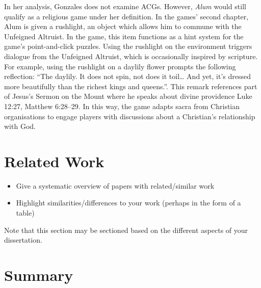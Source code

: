 In her analysis, Gonzales does not examine \acp{ACG}. However, \textit{Alum} would still qualify as a religious game under her definition. In the games' second chapter, Alum is given a rushlight, an object which allows him to commune with the Unfeigned Altruist. In the game, this item functions as a hint system for the game's point-and-click puzzles. Using the rushlight on the environment triggers dialogue from the Unfeigned Altruist, which is occasionally inspired by scripture. For example, using the rushlight on a daylily flower prompts the following reflection: ``The daylily. It does not spin, not does it toil… And yet, it’s dressed more beautifully than the richest kings and queens.''. This remark references part of Jesus's Sermon on the Mount where he speaks about divine providence Luke 12:27, Matthew 6:28–29. In this way, the game adapts sacra from Christian organisations to engage players with discussions about a Christian's relationship with God.




\section{Related Work}

  \begin{itemize}
   \item Give a systematic overview of papers with related/similar work
   \item Highlight similarities/differences to your work (perhaps in the form of a table)
  \end{itemize}

  Note that this section may be sectioned based on the different aspects of your dissertation.
\fi

\section{Summary}
\blindtext
